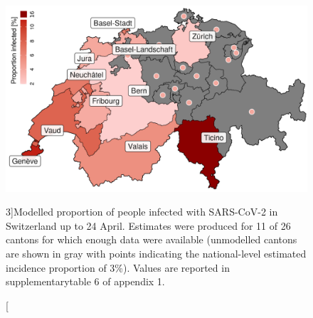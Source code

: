 \begin{figure}\centering
  \includegraphics[width=\textwidth]{fig_covid-switzerland-npi/FIGURE_5_mod.png}
  \caption[Modelled proportion of people infected with SARS-CoV-2 in Switzerland.][3\baselineskip]{Modelled proportion of people infected with SARS-CoV-2 in Switzerland up to 24 April. Estimates were produced for 11 of 26 cantons for which enough data were available (unmodelled cantons are shown in gray with points indicating the national-level estimated incidence proportion of 3\%). Values are reported in supplementarytable 6 of appendix 1.}
  \label{fig:covid-ch-map}
\end{figure}

